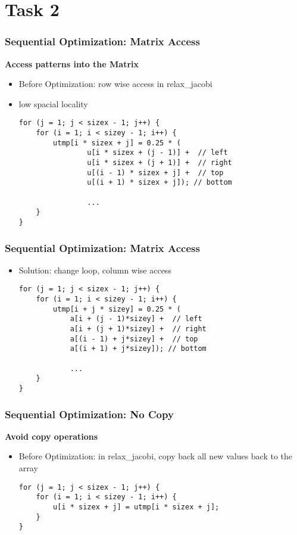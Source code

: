 \section{Task 2}
\begin{frame}[fragile]
\frametitle{Sequential Optimization: Matrix Access}
\textbf{Access patterns into the Matrix}
\begin {itemize}
\item Before Optimization: row wise access in relax\_jacobi
\item low spacial locality

\begin{lstlisting}
for (j = 1; j < sizex - 1; j++) {
	for (i = 1; i < sizey - 1; i++) {
		utmp[i * sizex + j] = 0.25 * (
				u[i * sizex + (j - 1)] +  // left
				u[i * sizex + (j + 1)] +  // right
				u[(i - 1) * sizex + j] +  // top
				u[(i + 1) * sizex + j]); // bottom
				
				...
	}
}
\end{lstlisting}

\end {itemize}
\end{frame}

\begin{frame}[fragile]
\frametitle{Sequential Optimization: Matrix Access}
\begin {itemize}
\item{Solution: change loop, column wise access }
\begin{lstlisting}
for (j = 1; j < sizex - 1; j++) {
	for (i = 1; i < sizey - 1; i++) {
		utmp[i + j * sizey] = 0.25 * (
			a[i + (j - 1)*sizey] +  // left
			a[i + (j + 1)*sizey] +  // right
			a[(i - 1) + j*sizey] +  // top
			a[(i + 1) + j*sizey]); // bottom
						
			...
	}
}
\end{lstlisting}

\end {itemize}
\end{frame}

\begin{frame}[fragile]
\frametitle{Sequential Optimization: No Copy}

\textbf{Avoid copy operations}
\begin {itemize}
\item Before Optimization: in relax\_jacobi, copy back all new values back to the array
\begin{lstlisting}
for (j = 1; j < sizex - 1; j++) {
	for (i = 1; i < sizey - 1; i++) {
		u[i * sizex + j] = utmp[i * sizex + j];
	}
}
\end{lstlisting}

\end {itemize}
\end{frame}

